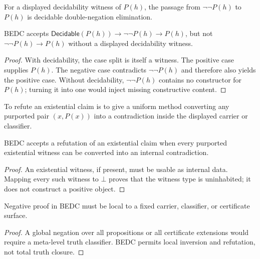 \begin{definition}
\label{def:philosophy-decidable-double-negation-elimination}
For a displayed decidability witness of \(P(h)\), the passage from
\(\neg\neg P(h)\) to \(P(h)\) is decidable double-negation elimination.
\end{definition}

\begin{theorem}
\label{thm:philosophy-double-negation-requires-decidability}
BEDC accepts \(\mathsf{Decidable}(P(h))\to\neg\neg P(h)\to P(h)\), but
not \(\neg\neg P(h)\to P(h)\) without a displayed decidability witness.
\end{theorem}
\begin{proof}
With decidability, the case split is itself a witness. The positive
case supplies \(P(h)\). The negative case contradicts \(\neg\neg P(h)\)
and therefore also yields the positive case. Without decidability,
\(\neg\neg P(h)\) contains no constructor for \(P(h)\); turning it into
one would inject missing constructive content.
\end{proof}

\begin{definition}
\label{def:philosophy-refuting-false-existence}
To refute an existential claim is to give a uniform method converting
any purported pair \((x, P(x))\) into a contradiction inside the
displayed carrier or classifier.
\end{definition}

\begin{theorem}
\label{thm:philosophy-false-existence-may-be-refuted}
BEDC accepts a refutation of an existential claim when every purported
existential witness can be converted into an internal contradiction.
\end{theorem}
\begin{proof}
An existential witness, if present, must be usable as internal data.
Mapping every such witness to \(\bot\) proves that the witness type is
uninhabited; it does not construct a positive object.
\end{proof}

\begin{corollary}
\label{cor:philosophy-negative-proof-local}
Negative proof in BEDC must be local to a fixed carrier, classifier, or
certificate surface.
\end{corollary}
\begin{proof}
A global negation over all propositions or all certificate extensions
would require a meta-level truth classifier. BEDC permits local
inversion and refutation, not total truth closure.
\end{proof}

